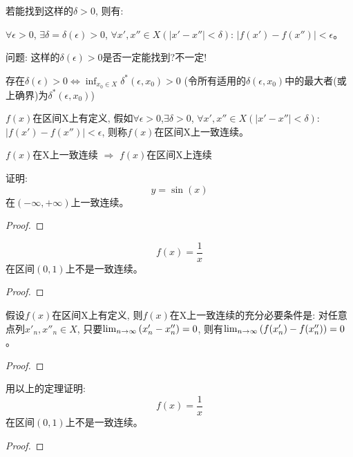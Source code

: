 若能找到这样的$\delta > 0$, 则有:

$\forall \epsilon > 0$, $\exists \delta = \delta(\epsilon) > 0$, $\forall x', x'' \in X(\left| x' - x'' \right| < \delta)$: $\left| f(x') - f(x'') \right| < \epsilon$。

问题: 这样的$\delta(\epsilon) > 0$是否一定能找到?不一定!

存在$\delta(\epsilon) > 0 \Longleftrightarrow \inf_{x_0 \in X}\delta^*(\epsilon, x_0) > 0$ (令所有适用的$\delta(\epsilon, x_0)$中的最大者(或上确界)为$\delta^*(\epsilon, x_0)$)

\begin{definition}[一致连续]
    $f(x)$在区间X上有定义, 假如$\forall \epsilon > 0$,$\exists \delta > 0$, $\forall x', x'' \in X(\left| x' - x'' \right| < \delta)$: $\left| f(x') - f(x'') \right| < \epsilon$, 则称$f(x)$在区间X上一致连续。
\end{definition}
$f(x)$在X上一致连续 $\Rightarrow$ $f(x)$在区间X上连续

\begin{proposition}
    证明:
    \[ y = \sin(x) \]
    在$(-\infty, +\infty)$上一致连续。
\end{proposition}
\begin{proof}
    
\end{proof}

\begin{proposition}
    \[ f(x) = \frac{1}{x} \]
    在区间$(0, 1)$上不是一致连续。
\end{proposition}
\begin{proof}
    
\end{proof}

\begin{theorem}
    假设$f(x)$在区间X上有定义, 则$f(x)$在X上一致连续的充分必要条件是: 对任意点列$x'_n, x''_n \in X$, 只要$\lim_{n \to \infty } \left( x'_n - x''_n \right) = 0$, 则有$\lim_{n \to \infty } \left(f(x'_n) - f(x''_n) \right) = 0$。
\end{theorem}
\begin{proof}
    
\end{proof}

\begin{proposition}
    用以上的定理证明:
    \[ f(x) = \frac{1}{x} \]
    在区间$(0, 1)$上不是一致连续。
\end{proposition}
\begin{proof}
    
\end{proof}

